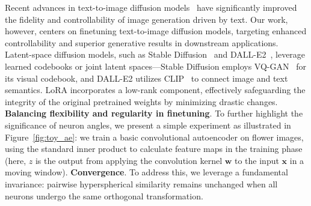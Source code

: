 Recent advances in text-to-image diffusion models~\cite{saharia2022photorealistic,ramesh2022hierarchical,rombach2022high} have significantly improved the fidelity and controllability of image generation driven by text. Our work, however, centers on finetuning text-to-image diffusion models, targeting enhanced controllability and superior generative results in downstream applications. Latent-space diffusion models, such as Stable Diffusion~\cite{rombach2022high} and DALL-E2~\cite{ramesh2022hierarchical}, leverage learned codebooks or joint latent spaces—Stable Diffusion employs VQ-GAN~\cite{esser2021taming} for its visual codebook, and DALL-E2 utilizes CLIP~\cite{radford2021learning} to connect image and text semantics. LoRA incorporates a low-rank component, effectively safeguarding the integrity of the original pretrained weights by minimizing drastic changes. \textbf{Balancing flexibility and regularity in finetuning}. To further highlight the significance of neuron angles, we present a simple experiment as illustrated in Figure~\ref{fig:toy_ae}: we train a basic convolutional autoencoder on flower images, using the standard inner product to calculate feature maps in the training phase (here, $z$ is the output from applying the convolution kernel $\bm{w}$ to the input $\bm{x}$ in a moving window). \textbf{Convergence}. To address this, we leverage a fundamental invariance: pairwise hyperspherical similarity remains unchanged when all neurons undergo the same orthogonal transformation.